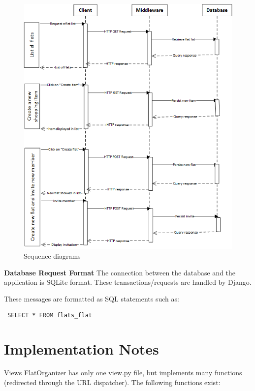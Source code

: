 \documentclass{sig-alt-release2}
\begin{document}
\begin{figure}[!ht]
\includegraphics[scale=0.55]{sequencediagrams}
\caption{Sequence diagrams}
\label{fig:sequence}
\end{figure}
 
\textbf{Database Request Format}
The connection between the database and the application is SQLite format. These transactions/requests are handled by Django.

These messages are formatted as SQL statements such as: 
\begin{verbatim} SELECT * FROM flats_flat \end{verbatim}



\section{Implementation Notes}

Views
FlatOrganizer has only one view.py file, but implements many functions (redirected through the URL dispatcher). The following functions exist:
\end{document}

